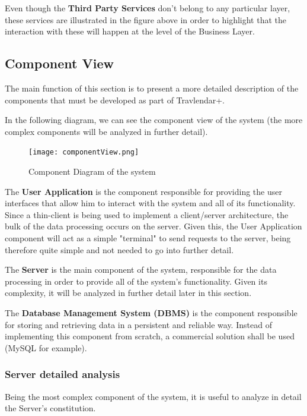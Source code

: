 \documentclass[12pt]{article}
\begin{document}
Even though the \textbf{Third Party Services} don't belong to any particular layer, these services are illustrated in the figure above in order to highlight that the interaction with these will happen at the level of the Business Layer.
\subsection{Component View}
The main function of this section is to present a more detailed description of the components that must be developed as part of Travlendar+.

In the following diagram, we can see the component view of the system (the more complex components will be analyzed in further detail).
\begin{figure}[H]
    \centering
    \texttt{[image: componentView.png]}
    \caption{Component Diagram of the system}
    \label{fig:componentView}
\end{figure}
The \textbf{User Application} is the component responsible for providing the user interfaces that allow him to interact with the system and all of its functionality. Since a thin-client is being used to implement a client/server architecture, the bulk of the data processing occurs on the server. Given this, the User Application component will act as a simple "terminal" to send requests to the server, being therefore quite simple and not needed to go into further detail.

The \textbf{Server} is the main component of the system, responsible for the data processing in order to provide all of the system's functionality. Given its complexity, it will be analyzed in further detail later in this section.

The \textbf{Database Management System (DBMS)} is the component responsible for storing and retrieving data in a persistent and reliable way. Instead of implementing this component from scratch, a commercial solution shall be used (MySQL for example).

\subsubsection{Server detailed analysis}
Being the most complex component of the system, it is useful to analyze in detail the Server's constitution.
\end{document}
